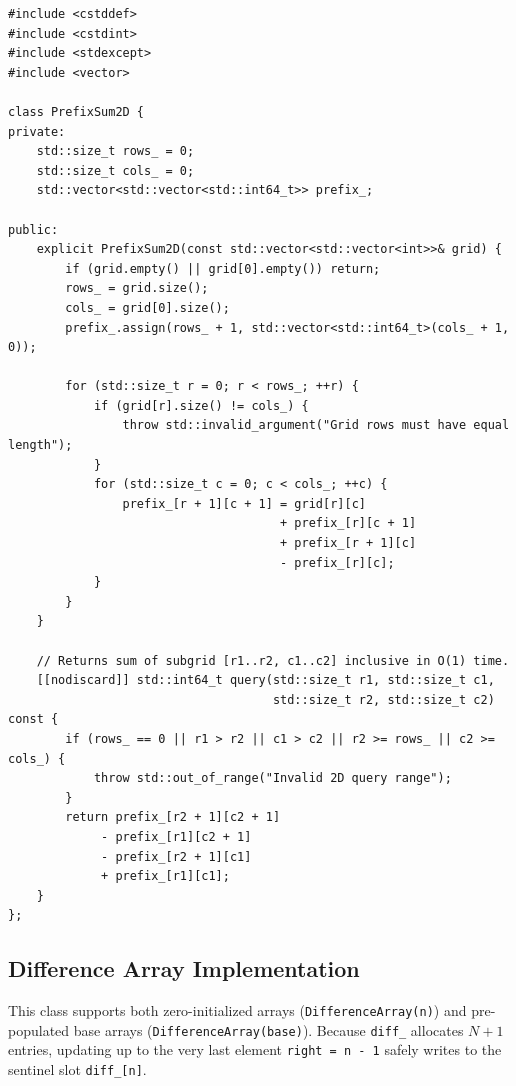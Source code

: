 \documentclass[11pt,a4paper]{article}
\theoremstyle{definition}
\begin{document}
\begin{lstlisting}[caption={2D Prefix Sum Data Structure (Wrap-Safe Inclusion-Exclusion)}]
#include <cstddef>
#include <cstdint>
#include <stdexcept>
#include <vector>

class PrefixSum2D {
private:
    std::size_t rows_ = 0;
    std::size_t cols_ = 0;
    std::vector<std::vector<std::int64_t>> prefix_;

public:
    explicit PrefixSum2D(const std::vector<std::vector<int>>& grid) {
        if (grid.empty() || grid[0].empty()) return;
        rows_ = grid.size();
        cols_ = grid[0].size();
        prefix_.assign(rows_ + 1, std::vector<std::int64_t>(cols_ + 1, 0));

        for (std::size_t r = 0; r < rows_; ++r) {
            if (grid[r].size() != cols_) {
                throw std::invalid_argument("Grid rows must have equal length");
            }
            for (std::size_t c = 0; c < cols_; ++c) {
                prefix_[r + 1][c + 1] = grid[r][c]
                                      + prefix_[r][c + 1]
                                      + prefix_[r + 1][c]
                                      - prefix_[r][c];
            }
        }
    }

    // Returns sum of subgrid [r1..r2, c1..c2] inclusive in O(1) time.
    [[nodiscard]] std::int64_t query(std::size_t r1, std::size_t c1,
                                     std::size_t r2, std::size_t c2) const {
        if (rows_ == 0 || r1 > r2 || c1 > c2 || r2 >= rows_ || c2 >= cols_) {
            throw std::out_of_range("Invalid 2D query range");
        }
        return prefix_[r2 + 1][c2 + 1]
             - prefix_[r1][c2 + 1]
             - prefix_[r2 + 1][c1]
             + prefix_[r1][c1];
    }
};
\end{lstlisting}

\subsection{Difference Array Implementation}

This class supports both zero-initialized arrays (\texttt{DifferenceArray(n)}) and pre-populated base arrays (\texttt{DifferenceArray(base)}). Because \texttt{diff\_} allocates $N + 1$ entries, updating up to the very last element \texttt{right = n - 1} safely writes to the sentinel slot \texttt{diff\_[n]}.
\end{document}
